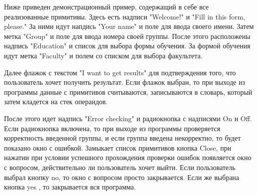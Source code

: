 \documentclass[14pt]{extarticle}
\begin{document}
	Ниже приведен демонстрационный пример, содержащий в себе все  реализованные примитивы.
	Здесь есть надписи "Welcome!" и "Fill in this form, please."
	За ними идут напдись "Your name" и поле для ввода своего имени.
	Затем метка "Group" и поле для ввода номера своей группы. 
	После этого расположены надпись "Education" и список для выбора формы обучения.
	За формой обучения идут метка "Faculty" и полем со списком для выбора факультета.
	
	Далее флажок с текстом "I want to get results" для подтверждения того, что пользователь хочет получить результат. Если флажок выбран, то при выходе из программы данные с примитивов считываются, записываются в словарь, который затем кладется на стек операндов.
	
	После этого идет надпись "Error checking" и радиокнопка с надписями On и Off. Если радиокнопка включена, то при выходе из программы проверяется корректность введенной группы, и если группа введена некорректно, то будет показано окно с ошибкой.	
	Замыкает список примитивов кнопка Close, при нажатии при условии успешного прохождения проверки ошибок появляется окно с вопросом, действительно ли пользователь хочет выйти. Если пользователь выбрал кнопку  no, то окно с вопросом просто закрывается. Если же выбрана кнопка yes , то закрывается вся программа.
	
\end{document}

